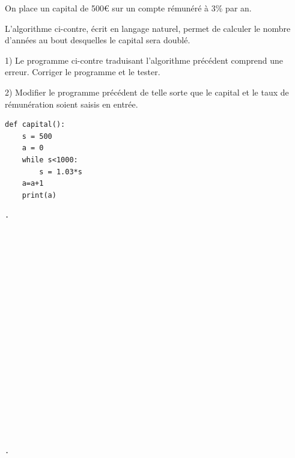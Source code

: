 \documentclass[12pt]{article}
\begin{document}
\begin{mdframed}[
    linewidth=1pt,
    roundcorner=5pt,
    linecolor=RoyalBlue,
    innertopmargin=10pt,
    innerbottommargin=10pt
]
\vspace{5pt}
On place un capital de 500€ sur un compte rémunéré
à 3\% par an.

L’algorithme ci-contre, écrit en langage naturel,
permet de calculer le nombre d'années au bout
desquelles le capital sera doublé.

\begin{minipage}[t]{.45\textwidth}%
    \vspace{0pt}
    \hspace{1cm} 1) Le programme ci-contre traduisant l'algorithme précédent
    comprend une erreur. Corriger le programme et le tester.

    \vspace{5pt}
    \hspace{1cm} 2) Modifier le programme précédent de telle sorte que le capital et
    le taux de rémunération soient saisis en entrée.
\end{minipage}%
\hfill
\begin{minipage}[t]{.5\textwidth}%
    \vspace{0pt}
\begin{lstlisting}
def capital():
    s = 500
    a = 0
    while s<1000:
        s = 1.03*s
    a=a+1
    print(a)
\end{lstlisting}
\end{minipage}%
\vspace{5pt}


\begin{lstlisting}
.



















.
\end{lstlisting}

\end{mdframed}
\end{document}
